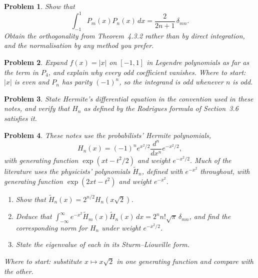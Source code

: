 \documentclass[12pt,a4paper]{report}
\theoremstyle{definition}
\theoremstyle{plain}
\newtheorem{problemx}{Problem}[section]
\newenvironment{problem}{\begin{problemx}}{\end{problemx}}
\begin{document}
\begin{problem}
Show that
$$\int^{1}_{-1}P_m(x)P_n(x)\,dx = \frac{2}{2n+1}\,\delta_{mn}.$$
Obtain the orthogonality from Theorem~4.3.2 rather than by direct integration,
and the normalisation by any method you prefer.
\end{problem}

\begin{problem}
Expand $f(x)=|x|$ on $[-1,1]$ in Legendre polynomials as far as the term in
$P_4$, and explain why every odd coefficient vanishes.
\emph{Where to start: $|x|$ is even and $P_n$ has parity $(-1)^{n}$, so the
integrand is odd whenever $n$ is odd.}
\end{problem}

\begin{problem}
State Hermite's differential equation in the convention used in these notes,
and verify that $H_n$ as defined by the Rodrigues formula of Section~3.6
satisfies it.
\end{problem}

\begin{problem}
\label{prob:hermiteconv}
These notes use the \emph{probabilists'} Hermite polynomials,
$$H_n(x) = (-1)^{n}e^{x^{2}/2}\frac{d^{n}}{dx^{n}}e^{-x^{2}/2},$$
with generating function $\exp\left(xt-t^{2}/2\right)$ and weight
$e^{-x^{2}/2}$. Much of the literature uses the \emph{physicists'} polynomials
$\widetilde{H}_n$, defined with $e^{-x^{2}}$ throughout, with generating
function $\exp\left(2xt-t^{2}\right)$ and weight $e^{-x^{2}}$.
\begin{enumerate}
\item[(a)] Show that $\widetilde{H}_n(x) = 2^{n/2}H_n\!\left(x\sqrt2\right)$.
\item[(b)] Deduce that
$\displaystyle\int^{\infty}_{-\infty}e^{-x^{2}}\widetilde{H}_m(x)\widetilde{H}_n(x)\,dx
= 2^{n}n!\sqrt{\pi}\,\delta_{mn}$,
and find the corresponding norm for $H_n$ under weight $e^{-x^{2}/2}$.
\item[(c)] State the eigenvalue of each in its Sturm--Liouville form.
\end{enumerate}
\emph{Where to start: substitute $x\mapsto x\sqrt2$ in one generating function
and compare with the other.}
\end{problem}
\end{document}
